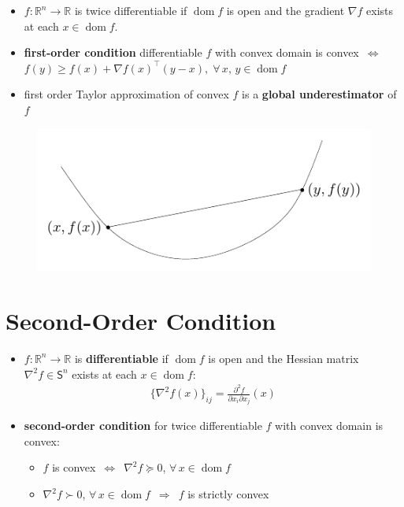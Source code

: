 \documentclass[11pt]{extarticle}
\newcommand{\ds}{\displaystyle}
\newcommand{\ie}{\,\Longrightarrow\,}
\newcommand{\ifff}{\,\Longleftrightarrow\,}
\DeclareMathOperator*{\dom}{dom}
\theoremstyle{definition}
\begin{document}
\begin{itemize}
  \item $f:\mathbb{R}^n\to\mathbb{R}$ is twice differentiable if $\dom f$ is open and the gradient $\nabla f$ exists at each $x\in\dom f$.
  \item {\bf first-order condition} differentiable $f$ with convex domain is convex $\ifff$ $\ds f(y) \geqslant f(x) + \nabla f(x)^\top(y - x),\;\forall\,x,\,y\in\dom f$
  \item first order Taylor approximation of convex $f$ is a {\bf global underestimator} of $f$
\end{itemize}
\vspace{-1em}
\begin{figure}[!htbp]
  \centering
  \includegraphics[scale=1,page=2]{fig/03.pdf}
\end{figure}

\newpage

\section*{Second-Order Condition}

\begin{itemize}
  \item $f:\mathbb{R}^n\to\mathbb{R}$ is {\bf differentiable} if $\dom f$ is open and the Hessian matrix $\nabla^2 f\in\mathsf{S}^n$ exists at each $x\in\dom f$: 
    \begin{align*}
      \big\{\nabla^2 f(x)\big\}_{ij} = \frac{\partial^2 f}{\partial x_i\partial x_j}(x)
    \end{align*}
  \item {\bf second-order condition} for twice differentiable $f$ with convex domain is convex: 
    \begin{itemize}
      \item $f$ is convex $\ifff$ $\nabla^2 f\succcurlyeq 0$, $\forall\,x\in\dom f$
      \item $\nabla^2 f\succ 0$, $\forall\,x\in\dom f$ $\ie$ $f$ is strictly convex
    \end{itemize}
\end{itemize}
\end{document}
